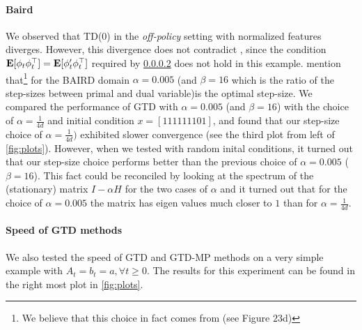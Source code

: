 \paragraph{Baird} We observed that TD(0) in the \emph{off-policy} setting with normalized features diverges. However, this divergence does not contradict , since the condition $\mathbf{E}[\phi_t\phi_t^\top]=\mathbf{E}[\phi'_t\phi_t^\top]$ required by \cref{} does not hold in this example. \citet{} mention that\footnote{We believe that this choice in fact comes from \cite{dann} (see Figure $23$d) } for the BAIRD domain $\alpha=0.005$ (and $\beta=16$ which is the ratio of the step-sizes between primal and dual variable)is the optimal step-size. We compared the performance of GTD with $\alpha=0.005$ (and $\beta=16$) with the choice of $\alpha=\frac{1}{4d}$ and initial condition $x=[1 1 1 1 1 1 10 1]$, and found that our step-size choice of $\alpha=\frac1{4d})$ exhibited slower convergence (see the third plot from left of \eqref{fig:plots}). However, when we tested with random inital conditions, it turned out that our step-size choice performs better than the previous choice of $\alpha=0.005$ ($\beta=16$). This fact could be reconciled by looking at the spectrum of the (stationary) matrix $I-\alpha H$ for the two cases of $\alpha$ and it turned out that for the choice of $\alpha=0.005$ the matrix has eigen values much closer to $1$ than for $\alpha=\frac1{4d}$.
\paragraph{Speed of GTD methods} 
We also tested the speed of GTD and GTD-MP methods on a very simple example with $A_t=b_t=a,\forall t\geq 0$. The results for this experiment can be found in the right most plot in \eqref{fig:plots}.